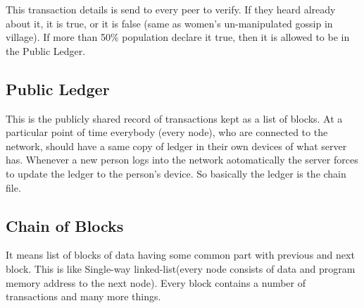 
This transaction details is send to every peer to verify. If they heard already about it, it is true, or it is false (same as women's un-manipulated gossip in village). If more than 50\% population declare it true, then it is allowed to be in the Public Ledger.

\subsection{Public Ledger}
This is the publicly shared record of transactions kept as a list of blocks. At a particular point of time everybody (every node), who are connected to the network, should have a same copy of ledger in their own devices of what server has. Whenever a new person logs into the network aotomatically the server forces to update the ledger to the person's device. So basically the ledger is the chain file.

\subsection{Chain of Blocks}
It means list of blocks of data having some common part with previous and next block. This is like Single-way linked-list(every node consists of data and program memory address to the next node). Every block contains a number of transactions and many more things.

